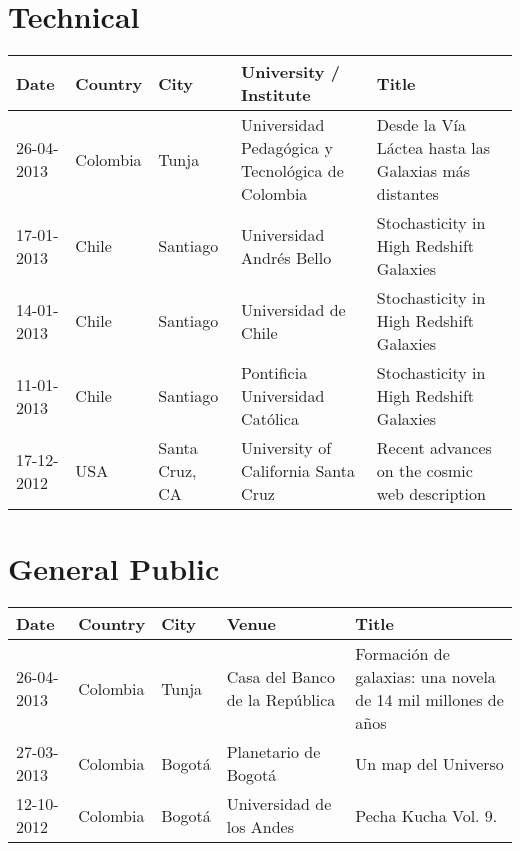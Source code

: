 \documentclass{report}
\begin{document}
\section*{Technical}

\begin{tabular}{p{2.0cm} p{1.5cm} p{1.5cm} p{2cm} p{5cm}}\hline
Date & Country & City& University / Institute & Title\\\hline
26-04-2013 & Colombia & Tunja & Universidad Pedag\'ogica y
Tecnol\'ogica de Colombia & Desde la V\'ia L\'actea hasta las Galaxias
m\'as distantes\\
17-01-2013 & Chile & Santiago  & Universidad Andr\'es Bello &
Stochasticity in High Redshift Galaxies\\
14-01-2013 & Chile & Santiago  & Universidad de Chile&
Stochasticity in High Redshift Galaxies\\
11-01-2013 & Chile & Santiago  & Pontificia Universidad Cat\'olica&
Stochasticity in High Redshift Galaxies\\
17-12-2012 & USA & Santa Cruz, CA & University of California Santa Cruz & Recent advances on the cosmic web description
\end{tabular}


\section*{General Public}


\begin{tabular}{p{2.0cm} p{1.5cm} p{1.5cm} p{2cm} p{5cm}}\hline
Date & Country & City& Venue& Title\\\hline
26-04-2013 & Colombia & Tunja & Casa del Banco de la Rep\'ublica &
Formaci\'on de galaxias: una novela de 14 mil millones de a\~nos\\  
27-03-2013 & Colombia & Bogot\'a & Planetario de Bogot\'a & Un map del
Universo\\
12-10-2012 & Colombia & Bogot\'a & Universidad de los Andes & Pecha
Kucha Vol. 9.
\end{tabular}
\end{document}

